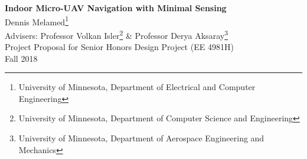 \documentclass[12pt]{article}
\begin{document}
\begin{titlepage}
	\begin{center}
		\vspace{20pt}
		{\bf \LARGE Indoor Micro-UAV Navigation with Minimal Sensing} \\
		\vspace{200pt}
		Dennis Melamed\footnote{University of Minnesota, Department of Electrical and Computer Engineering} \\
		Advisers: Professor Volkan Isler\footnote{University of Minnesota, Department of Computer Science and Engineering} \& Professor Derya Aksaray\footnote{University of Minnesota, Department of Aerospace Engineering and Mechanics} \\
		Project Proposal for Senior Honors Design Project (EE 4981H)\\
		Fall 2018 \\
	\end{center}
\end{titlepage}


\begin{abstract}
The usage of a small UAV with minimal sensing abilities to navigate complex indoor environments outside a motion capture system has not been well explored. This work proposes to develop a framework to fly out the door of a room from a random initial location using a micro-UAV with low-accuracy sensors. The sensing abilities will be limited by the payload of the UAV to a low-resolution gray-scale camera and a low-accuracy IMU. The framework will consist of several interacting components: door detection (by a simple Hough transform procedure or a convolutional neural network), flight planning (via dead reckoning, a recurrent neural network, or a reinforcement learning network), and a lower level flight controller. Each proposed method will be tested and compared against other solutions in simulation and in real life.
\end{abstract}

\tableofcontents

\listoffigures

\end{document}
